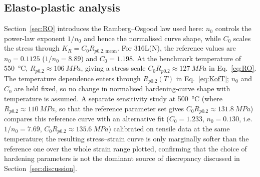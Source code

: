 \documentclass[10pt,a4paper]{article}
\begin{document}
\clearpage
\subsection{Elasto-plastic analysis}

Section~\ref{sec:RO} introduces the Ramberg--Osgood law used here: $n_0$ controls the power-law exponent $1/n_0$ and hence the normalised curve shape, while $C_0$ scales the stress through $K_R=C_0R_{p0.2,\mathrm{mean}}$. For 316L(N), the reference values are $n_0=0.1125$ ($1/n_0=8.89$) and $C_0=1.198$. At the benchmark temperature of \SI{550}{\celsius}, $R_{p0.2}\approx\SI{106}{MPa}$, giving a stress scale $C_0R_{p0.2}\approx\SI{127}{MPa}$ in Eq.~\eqref{eq:RO}. The temperature dependence enters through $R_{p0.2}(T)$ in Eq.~\eqref{eq:KofT}; $n_0$ and $C_0$ are held fixed, so no change in normalised hardening-curve shape with temperature is assumed. A separate sensitivity study at \SI{500}{\celsius} (where $R_{p0.2}\approx\SI{110}{MPa}$, so that the reference parameter set gives $C_0R_{p0.2}\approx\SI{131.8}{MPa}$) compares this reference curve with an alternative fit ($C_0=1.233$, $n_0=0.130$, i.e. $1/n_0=7.69$, $C_0R_{p0.2}\approx\SI{135.6}{MPa}$) calibrated on tensile data at the same temperature; the resulting stress--strain curve is only marginally softer than the reference one over the whole strain range plotted, confirming that the choice of hardening parameters is not the dominant source of discrepancy discussed in Section~\ref{sec:discussion}.
\end{document}
